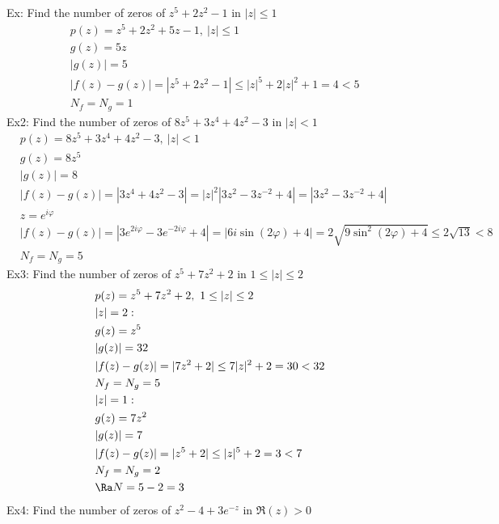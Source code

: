 Ex: Find the number of zeros of $z^5+2z^2-1$ in $|z|\leq1$
\begin{align*}
    &p(z)=z^5+2z^2+5z-1,\ |z|\leq 1\\
    &g(z)=5z\\
    &|g(z)|=5\\
    &|f(z)-g(z)|=|z^5+2z^2-1|\leq|z|^5+2|z|^2+1=4<5\\
    &N_f=N_g=1
\end{align*}
Ex2: Find the number of zeros of $8z^5+3z^4+4z^2-3$ in $|z|<1$
\begin{align*}
    &p(z)=8z^5+3z^4+4z^2-3,\ |z|<1\\
    &g(z)=8z^5\\
    &|g(z)|=8\\
    &|f(z)-g(z)|=|3z^4+4z^2-3|=|z|^2|3z^2-3z^{-2}+4|=|3z^2-3z^{-2}+4|\\
    &z=e^{i\varphi}\\
    &|f(z)-g(z)|=|3e^{2i\varphi}-3e^{-2i\varphi}+4|=|6i\sin(2\varphi)+4|=2\sqrt{9\sin^2(2\varphi)+4}\leq2\sqrt{13}<8\\
    &N_f=N_g=5
\end{align*}
Ex3: Find the number of zeros of $z^5+7z^2+2$ in $1\leq|z|\leq2$
\begin{align*}
    &p(z)=z^5+7z^2+2,\ 1\leq|z|\leq2\\
    &|z|=2:\\
    &g(z)=z^5\\
    &|g(z)|=32\\
    &|f(z)-g(z)|=|7z^2+2|\leq7|z|^2+2=30<32\\
    &N_f=N_g=5\\
    &|z|=1:\\
    &g(z)=7z^2\\
    &|g(z)|=7\\
    &|f(z)-g(z)|=|z^5+2|\leq|z|^5+2=3<7\\
    &N_f=N_g=2\\
    &\Ra N=5-2=3
\end{align*}
Ex4: Find the number of zeros of $z^2-4+3e^{-z}$ in $\Re(z)>0$
\begin{center}
\end{center}
